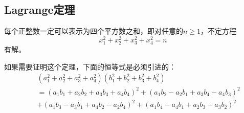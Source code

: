 \documentclass{ctexart}
\begin{document}
\subsection{Lagrange定理}

每个正整数一定可以表示为四个平方数之和，即对任意的$n\geq 1$，不定方程
\begin{displaymath}
x_1^2+x_2^2+x_3^2+x_4^2=n
\end{displaymath}
有解。

如果需要证明这个定理，下面的恒等式是必须引进的：
\begin{eqnarray*}
&&(a_1^2+a_2^2+a_3^2+a_4^2)(b_1^2+b_2^2+b_3^2+b_4^2)\\
&&=(a_1b_1+a_2b_2+a_3b_3+a_4b_4)^2+(a_1b_2-a_2b_1+a_3b_4-a_4b_3)^2\\
&&+(a_1b_3-a_3b_1+a_4b_2-a_2b_4)^2+(a_1b_4-a_4b_1+a_2b_3-a_3b_2)^2
\end{eqnarray*}
\end{document}
